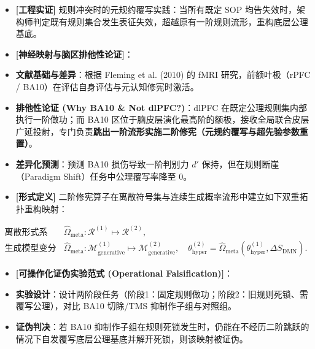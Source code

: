 \documentclass[11pt,a4paper,oneside]{ctexart}
\begin{document}
\begin{itemize}\item \textbf{[工程实证]} 规则冲突时的元规约覆写实践：当所有既定 SOP 均告失效时，架构师判定既有规则集合发生表征失效，超越原有一阶规则流形，重构底层公理基底。\end{itemize}
\begin{itemize}\item \textbf{[神经映射与脑区排他性论证]}：\end{itemize}
\begin{itemize}\item \textbf{文献基础与差异}：根据 Fleming et al. (2010) 的 fMRI 研究，前额叶极（rPFC / BA10）在评估自身评估与元认知修宪时激活。\end{itemize}
\begin{itemize}\item \textbf{排他性论证 (Why BA10 \& Not dlPFC?)}：dlPFC 在既定公理规则集内部执行一阶做功；而 BA10 区位于脑皮层演化最高阶的额极，接收全局联合皮层广延投射，专门负责\textbf{跳出一阶流形实施二阶修宪（元规约覆写与超先验参数重置）}。\end{itemize}
\begin{itemize}\item \textbf{差异化预测}：预测 BA10 损伤导致一阶判别力 $d'$ 保持，但在规则断崖（Paradigm Shift）任务中公理覆写率降至 0。\end{itemize}
\begin{itemize}\item \textbf{[形式定义]} 二阶修宪算子在离散符号集与连续生成概率流形中建立如下双重拓扑重构映射：\end{itemize}
\begin{equation}
\begin{aligned}
\text{离散形式系统：} \quad & \hat{\Omega}_{\text{meta}}: \mathcal{R}^{(1)} \mapsto \mathcal{R}^{(2)}, \\
\text{生成模型变分流形：} \quad & \hat{\Omega}_{\text{meta}}: \mathcal{M}_{\text{generative}}^{(1)} \mapsto \mathcal{M}_{\text{generative}}^{(2)}, \quad \theta_{\text{hyper}}^{(2)} = \hat{\Omega}_{\text{meta}}\left(\theta_{\text{hyper}}^{(1)}, \Delta S_{\text{DMN}}\right).
\end{aligned}
\end{equation}
\begin{itemize}\item \textbf{[可操作化证伪实验范式 (Operational Falsification)]}：\end{itemize}
\begin{itemize}\item \textbf{实验设计}：设计两阶段任务（阶段1：固定规则做功；阶段2：旧规则死锁、需覆写公理），对比 BA10 切除/TMS 抑制作子组与对照组。\end{itemize}
\begin{itemize}\item \textbf{证伪判决}：若 BA10 抑制作子组在规则死锁发生时，仍能在不经历二阶跳跃的情况下自发覆写底层公理基底并解开死锁，则该映射被证伪。\end{itemize}
\end{document}
